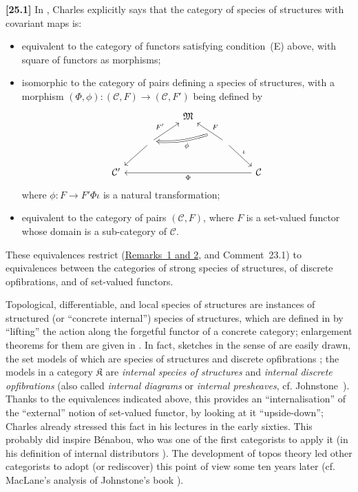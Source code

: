 \documentclass[a4paper,fleqn]{article}
\theoremstyle{plain}
\theoremstyle{definition}
\newenvironment{longcomm}[1]
  {\noindent\textbf{[#1]}\rmfamily}
  {}
\newcommand{\CC}{\mathcal{C}}
\newcommand{\MM}{\mathfrak{M}}
\newcommand{\KK}{\mathfrak{K}}
\begin{document}
\begin{longcomm}{25.1}
  In \cite{coll55}, Charles explicitly says that the category of species of structures with covariant maps is:

  \begin{itemize}
    \item equivalent to the category of functors satisfying condition~(E) above, with square of functors as morphisms;

    \item isomorphic to the category of pairs defining a species of structures, with a morphism $(\Phi,\phi)\colon(\CC,F)\to(\CC,F')$ being defined by
      \[
        \begin{tikzcd}
          &&\MM
        \\& \ar[ur,"F'"] \ar[dl]
          && \ar[ul,swap,"F",""{below,name=F}] \ar[dr,"\iota"] \ar[ll,from=F,Rightarrow,bend left=10,"\phi"]
        \\\CC'
          &&&& \CC \ar[llll,"\Phi"]
        \end{tikzcd}
      \]
      where $\phi\colon F\to F'\Phi\iota$ is a natural transformation;

    \item equivalent to the category of pairs $(\CC,F)$, where $F$ is a set-valued functor whose domain is a sub-category of $\CC$.
  \end{itemize}

  These equivalences restrict (\hyperref[remark:i-2]{Remarks~1 and 2}, and Comment~23.1) to equivalences between the categories of strong species of structures, of discrete opfibrations, and of set-valued functors.

  Topological, differentiable, and local species of structures are instances of structured (or ``concrete internal'') species of structures, which are defined in \cite{coll59,coll60} by ``lifting'' the action along the forgetful functor of a concrete category;
  enlargement theorems for them are given in \cite{coll89,coll90,coll95,coll96}.
  In fact, sketches in the sense of \cite{coll106} are easily drawn, the set models of which are species of structures and discrete opfibrations \cite{coll117};
  the models in a category $\KK$ are \emph{internal species of structures} and \emph{internal discrete opfibrations} (also called \emph{internal diagrams} or \emph{internal presheaves}, cf. Johnstone~\cite{comm56}).
  Thanks to the equivalences indicated above, this provides an ``internalisation'' of the ``external'' notion of set-valued functor, by looking at it ``upside-down'';
  Charles already stressed this fact in his lectures in the early sixties.
  This probably did inspire Bénabou, who was one of the first categorists to apply it (in his definition of internal distributors \cite{comm7}).
  The development of topos theory led other categorists to adopt (or rediscover) this point of view some ten years later (cf. MacLane's analysis of Johnstone's book \cite{comm75}).
\end{longcomm}
\end{document}
